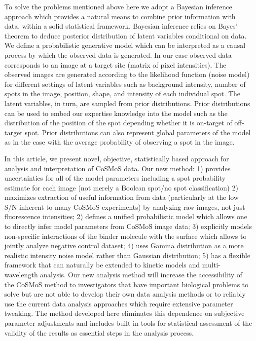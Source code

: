 To solve the problems mentioned above here we adopt a Bayesian inference approach which provides a natural means to combine prior information with data, within a solid statistical framework. Bayesian inference relies on Bayes' theorem to deduce posterior distribution of latent variables conditional on data. We define a probabilistic generative model which can be interpreted as a causal process by which the observed data is generated. In our case observed data corresponds to an image at a target site (matrix of pixel intensities). The observed images are generated according to the likelihood function (noise model) for different settings of latent variables such as background intensity, number of spots in the image, position, shape, and intensity of each individual spot. The latent variables, in turn, are sampled from prior distributions. Prior distributions can be used to embed our expertise knowledge into the model such as the distribution of the position of the spot depending whether it is on-target of off-target spot. Prior distributions can also represent global parameters of the model as in the case with the average probability of observing a spot in the image.

In this article, we present novel, objective, statistically based approach for analysis and interpretation of CoSMoS data. Our new method: 1) provides uncertainties for all of the model parameters including a spot probability estimate for each image (not merely a Boolean spot/no spot classification) 2) maximizes extraction of useful information from data (particularly at the low S/N inherent to many CoSMoS experiments) by analyzing raw images, not just fluorescence intensities; 2) defines a unified probabilistic model which allows one to directly infer model parameters from CoSMoS image data; 3) explicitly models non-specific interactions of the binder molecule with the surface which allows to jointly analyze negative control dataset; 4) uses Gamma distribution as a more realistic intensity noise model rather than Gaussian distribution; 5) has a flexible framework that can naturally be extended to kinetic models and multi-wavelength analysis. Our new analysis method will increase the accessibility of the CoSMoS method to investigators that have important biological problems to solve but are not able to develop their own data analysis methods or to reliably use the current data analysis approaches which require extensive parameter tweaking. The method developed here eliminates this dependence on subjective parameter adjustments and includes built-in tools for statistical assessment of the validity of the results as essential steps in the analysis process.